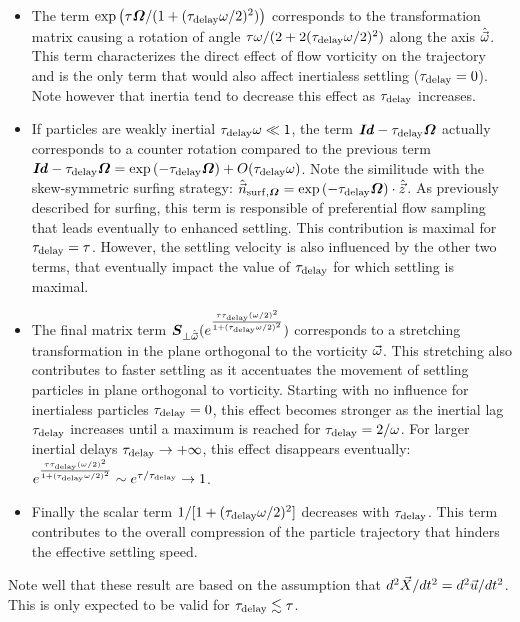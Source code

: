 \begin{itemize}
	\item The term $\exp \left( \tau \boldsymbol{\varOmega} / (1 + (\tau_{\mathrm{delay}} \omega/2)^2) \right)$ corresponds to the transformation matrix causing a rotation of angle $\tau \omega / (2 + 2 (\tau_{\mathrm{delay}} \omega/2)^2)$ along the axis $\hat{\vec{\omega}}$. This term characterizes the direct effect of flow vorticity on the trajectory and is the only term that would also affect inertialess settling ($\tau_{\mathrm{delay}} = 0$). Note however that inertia tend to decrease this effect as $\tau_{\mathrm{delay}}$ increases.
	\item If particles are weakly inertial $\tau_{\mathrm{delay}} \omega \ll 1$, the term $\boldsymbol{\mathit{Id}} - \tau_{\mathrm{delay}} \boldsymbol{\varOmega}$ actually corresponds to a counter rotation compared to the previous term $\boldsymbol{\mathit{Id}} - \tau_{\mathrm{delay}} \boldsymbol{\varOmega} = \exp \left( - \tau_{\mathrm{delay}} \boldsymbol{\varOmega} \right) + O(\tau_{\mathrm{delay}} \omega)$. 
		Note the similitude with the skew-symmetric surfing strategy: $\hat{\vec{n}}_{\mathrm{surf}, \boldsymbol{\varOmega}} = \exp \left( - \tau_{\mathrm{delay}} \boldsymbol{\varOmega} \right) \cdot \hat{\vec{z}}$. 
		As previously described for surfing, this term is responsible of preferential flow sampling that leads eventually to enhanced settling.
		This contribution is maximal for $\tau_{\mathrm{delay}} = \tau$. 
		However, the settling velocity is also influenced by the other two terms, that eventually impact the value of $\tau_{\mathrm{delay}}$ for which settling is maximal.
	\item The final matrix term $\boldsymbol{S}_{\perp \hat{\vec{\omega}}} ( e^{\frac{\tau \tau_{\mathrm{delay}} (\omega/2)^2}{1 + (\tau_{\mathrm{delay}} \omega/2)^2}} )$ corresponds to a stretching transformation in the plane orthogonal to the vorticity $\vec{\omega}$. 
		This stretching also contributes to faster settling as it accentuates the movement of settling particles in plane orthogonal to vorticity. 
		Starting with no influence for inertialess particles $\tau_{\mathrm{delay}} = 0$, this effect becomes stronger as the inertial lag $\tau_{\mathrm{delay}}$ increases until a maximum is reached for $\tau_{\mathrm{delay}} = 2 / \omega$. 
		For larger inertial delays $\tau_{\mathrm{delay}} \to +\infty$, this effect disappears eventually: $e^{\frac{\tau \tau_{\mathrm{delay}} (\omega/2)^2}{1 + (\tau_{\mathrm{delay}} \omega/2)^2}} \sim e^{\tau / \tau_{\mathrm{delay}}} \to 1$.
	\item Finally the scalar term $1/[1 + (\tau_{\mathrm{delay}} \omega / 2)^2]$ decreases with $\tau_{\mathrm{delay}}$. 
		This term contributes to the overall compression of the particle trajectory that hinders the effective settling speed.
\end{itemize}
Note well that these result are based on the assumption that $d^2 \vec{X} / dt^2 = d^2 \vec{u} / dt^2$.
This is only expected to be valid for $\tau_{\mathrm{delay}} \lesssim \tau$.


